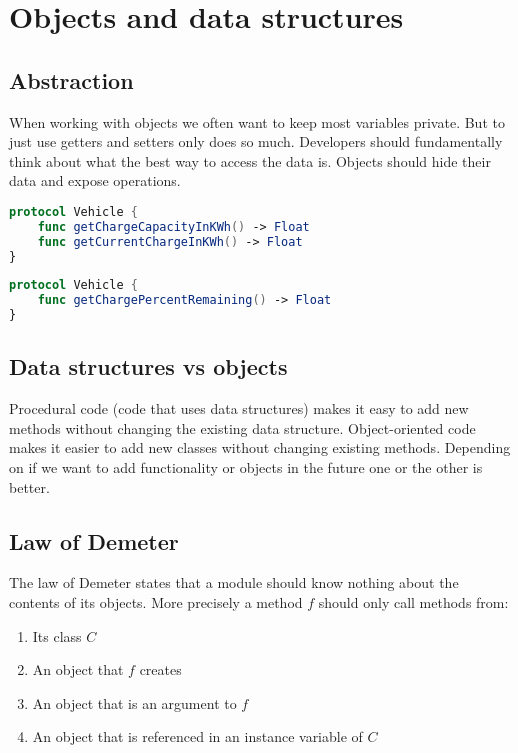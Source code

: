 \section{Objects and data structures}

\subsection{Abstraction}
When working with objects we often want to keep most variables private. But to just use getters and setters only does so much. Developers should fundamentally think about what the best way to access the data is. Objects should hide their data and expose operations.

\begin{lstlisting}[language=Swift, caption={Naive way to expose a vehicles charge}]
protocol Vehicle {
    func getChargeCapacityInKWh() -> Float
    func getCurrentChargeInKWh() -> Float
}
\end{lstlisting}

\begin{lstlisting}[language=Swift, caption={Better way to expose a vehicles charge}]
protocol Vehicle {
    func getChargePercentRemaining() -> Float
}
\end{lstlisting}

\subsection{Data structures vs objects}
Procedural code (code that uses data structures) makes it easy to add new methods without changing the existing data structure. Object-oriented code makes it easier to add new classes without changing existing methods. Depending on if we want to add functionality or objects in the future one or the other is better.

\subsection{Law of Demeter}
The law of Demeter states that a module should know nothing about the contents of its objects. More precisely a method \( f \) should only call methods from:

\begin{enumerate}
\item Its class \( C \)
\item An object that \( f \) creates
\item An object that is an argument to \( f \)
\item An object that is referenced in an instance variable of \( C \)
\end{enumerate}
